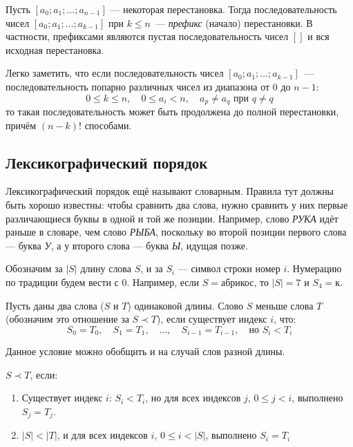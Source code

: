 \documentclass[12pt,a4paper,oneside]{article}
\begin{document}
\begin{definition}
Пусть $[a_0; a_1; \dots; a_{n-1}]$ --- некоторая перестановка.
Тогда последовательность чисел $[a_0; a_1; \dots; a_{k-1}]$ при $k \le n$~--- 
\emph{префикс} (начало) перестановки. В частности, префиксами
являются пустая последовательность чисел $[]$ и вся исходная перестановка.
\end{definition}

Легко заметить, что если последовательность чисел $[a_0; a_1; \dots; a_{k-1}]$~---
последовательность попарно различных чисел из диапазона от $0$ до $n-1$:
$$0 \le k \le n, \quad 0 \le a_i < n, \quad a_p \ne a_q \mbox{ при } q \ne q$$
то такая последовательность
может быть продолжена до полной перестановки, причём $(n-k)!$ способами.

\subsection{Лексикографический порядок}

Лексикографический порядок ещё называют словарным. Правила тут должны быть
хорошо известны: чтобы сравнить два слова, нужно сравнить у них первые различающиеся 
буквы в одной и той же позиции. 
Например, слово \emph{РУКА} идёт раньше в словаре, чем слово \emph{РЫБА}, поскольку во второй
позиции первого слова --- буква \emph{У}, а у второго слова --- буква \emph{Ы}, идущая позже.

\begin{definition}
Обозначим за $|S|$ длину слова $S$, и за $S_i$ --- символ строки номер $i$. Нумерацию по
традиции будем вести с $0$.
Например, если $S = \texttt{абрикос}$, то $|S|=7$ и $S_4=\texttt{к}$.
\end{definition}

\begin{definition}
Пусть даны два слова ($S$ и $T$) одинаковой длины.
Слово $S$ меньше слова $T$ (обозначим это отношение за $S \prec T$), 
если существует индекс $i$, что:
$$S_0 = T_0, \quad S_1 = T_1, \quad \dots, \quad S_{i-1} = T_{i-1}, \quad \mbox{но } S_i < T_i$$
\end{definition}

\noindent Данное условие можно обобщить и на случай слов разной длины.
\begin{definition}
$S \prec T$, если:
\begin{enumerate}
\item Существует индекс $i$: $S_i < T_i$, но для всех индексов $j$, $0 \le j < i$, выполнено $S_j = T_j$.
\item $|S| < |T|$, и для всех индексов $i$, $0 \le i < |S|$, выполнено $S_i=T_i$
\end{enumerate}
\end{definition}
\end{document}
